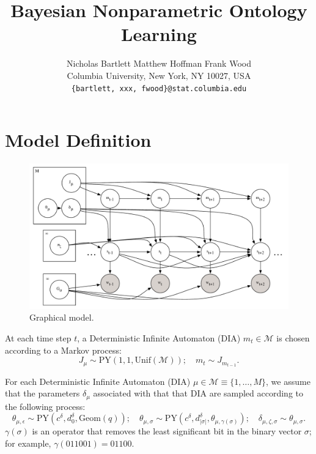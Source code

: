 \documentclass{article}
\title{Bayesian Nonparametric Ontology Learning}
\author{
Nicholas Bartlett \hspace{1cm} Matthew Hoffman \hspace{1cm} Frank Wood\\
Columbia University, New York, NY 10027, USA \\
\texttt{\{bartlett, xxx, fwood\}@stat.columbia.edu}
}
\newcommand{\PY}{\textrm{PY}}
\newcommand{\geom}{\textrm{Geom}}
\newcommand{\unif}{\textrm{Unif}}
\begin{document}
\maketitle




\section{Model Definition}

\begin{figure}[htbp]
\centering
\includegraphics[width=1\textwidth]{figures/graphicalmodel}
\caption{Graphical model. \label{fig:graphicalmodel}}
\end{figure}



At each time step $t$, a Deterministic Infinite Automaton (DIA) $m_t
\in \mathcal{M}$ is chosen according to a Markov process:
\begin{equation}
J_\mu \sim \PY(1, 1, \unif(\mathcal{M}));\quad
m_t \sim J_{m_{t-1}}.
\end{equation}

For each Deterministic Infinite Automaton (DIA) $\mu \in \mathcal{M}
\equiv \{1,\ldots,M\}$, we assume that the parameters $\delta_\mu$
associated with that that DIA are sampled according to the following
process:
\begin{equation}
\theta_{\mu,\epsilon} \sim \PY(c^{\delta}, d^{\delta}_{0},\geom(q)); \quad
\theta_{\mu,\sigma} \sim \PY(c^{\delta}, d^{\delta}_{|\sigma|},
\theta_{\mu,\gamma(\sigma)}); \quad
\delta_{\mu,\zeta,\sigma} \sim \theta_{\mu,\sigma}.
\end{equation}
$\gamma(\sigma)$ is an operator that removes the least significant bit
in the binary vector $\sigma$; for example, $\gamma(011001)=01100$.
\end{document}
